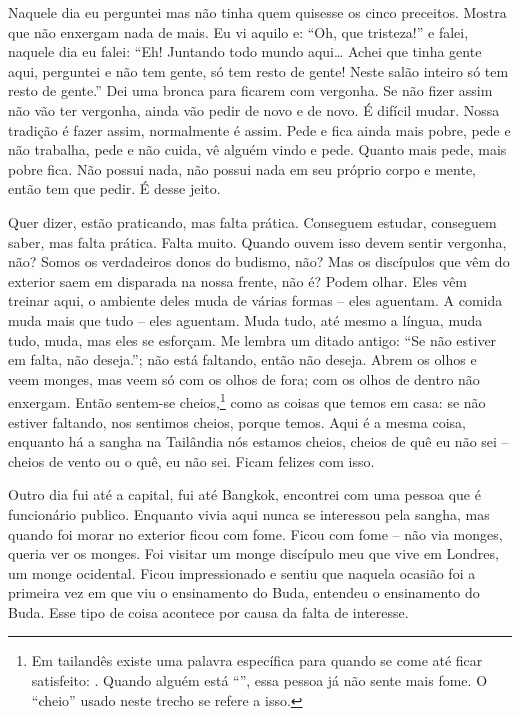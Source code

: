 Naquele dia eu perguntei mas não tinha quem quisesse os cinco
preceitos. Mostra que não enxergam nada de mais. Eu vi aquilo e: “Oh,
que tristeza!” e falei, naquele dia eu falei: “Eh! Juntando todo mundo
aqui\ldots{} Achei que tinha gente aqui, perguntei e não tem gente, só tem
resto de gente! Neste salão inteiro só tem resto de gente.” Dei uma
bronca para ficarem com vergonha. Se não fizer assim não vão ter
vergonha, ainda vão pedir de novo e de novo. É difícil mudar. Nossa
tradição é fazer assim, normalmente é assim. Pede e fica ainda mais
pobre, pede e não trabalha, pede e não cuida, vê alguém vindo e pede.
Quanto mais pede, mais pobre fica. Não possui nada, não possui nada em
seu próprio corpo e mente, então tem que pedir. É desse jeito.

Quer dizer, estão praticando, mas falta prática. Conseguem estudar,
conseguem saber, mas falta prática. Falta muito. Quando ouvem isso
devem sentir vergonha, não? Somos os verdadeiros donos do budismo, não?
Mas os discípulos que vêm do exterior saem em disparada na nossa
frente, não é? Podem olhar. Eles vêm treinar aqui, o ambiente deles
muda de várias formas – eles aguentam. A comida muda
mais que tudo – eles aguentam. Muda tudo, até mesmo
a língua, muda tudo, muda, mas eles se esforçam. Me lembra um ditado
antigo: “Se não estiver em falta, não deseja.”; não está faltando,
então não deseja. Abrem os olhos e veem monges, mas veem só com os
olhos de fora; com os olhos de dentro não enxergam. Então sentem-se
cheios,\footnote{Em tailandês existe uma palavra específica para quando
se come até ficar satisfeito: . Quando alguém
está “”, essa pessoa já não sente mais fome. O
“cheio” usado neste trecho se refere a isso.} como as coisas que temos
em casa: se não estiver faltando, nos sentimos cheios, porque temos.
Aqui é a mesma coisa, enquanto há a sangha na Tailândia nós estamos
cheios, cheios de quê eu não sei – cheios de vento
ou o quê, eu não sei. Ficam felizes com isso. 

Outro dia fui até a capital, fui até Bangkok, encontrei com uma
pessoa que é funcionário publico. Enquanto vivia aqui nunca se
interessou pela sangha, mas quando foi morar no exterior ficou com
fome. Ficou com fome – não via monges, queria ver os
monges. Foi visitar um monge discípulo meu que vive em Londres, um
monge ocidental. Ficou impressionado e sentiu que naquela ocasião foi a
primeira vez em que viu o ensinamento do Buda, entendeu o ensinamento
do Buda. Esse tipo de coisa acontece por causa da falta de interesse. 

